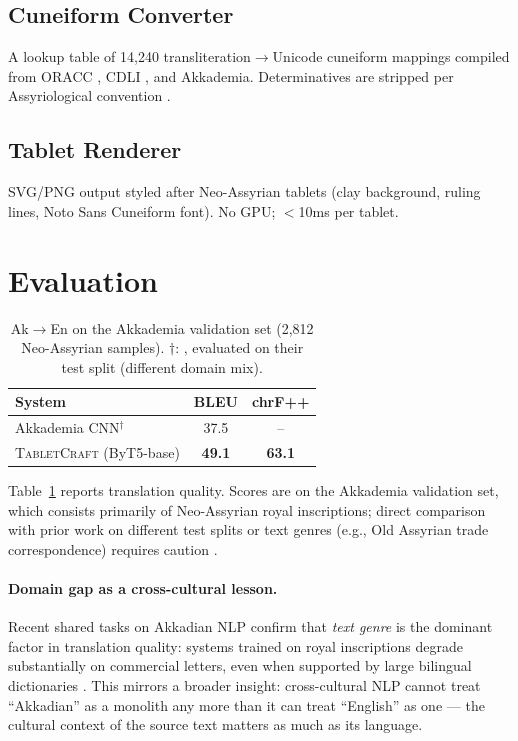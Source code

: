 \documentclass[11pt]{article}
\begin{document}
\subsection{Cuneiform Converter}

A lookup table of 14,240 transliteration$\rightarrow$Unicode cuneiform mappings compiled from ORACC \cite{oracc}, CDLI \cite{cdli}, and Akkademia.
Determinatives are stripped per Assyriological convention \cite{huehnergard2011grammar}.

\subsection{Tablet Renderer}

SVG/PNG output styled after Neo-Assyrian tablets (clay background, ruling lines, Noto Sans Cuneiform font). No GPU; $<$10ms per tablet.

\section{Evaluation}

\begin{table}[t]
\centering
\small
\begin{tabular}{lcc}
\toprule
\textbf{System} & \textbf{BLEU} & \textbf{chrF++} \\
\midrule
Akkademia CNN$^\dagger$ & 37.5 & -- \\
\textsc{TabletCraft} (ByT5-base) & \textbf{49.1} & \textbf{63.1} \\
\bottomrule
\end{tabular}
\caption{Ak$\rightarrow$En on the Akkademia validation set (2,812 Neo-Assyrian samples). $\dagger$: \citet{gutherz2023translating}, evaluated on their test split (different domain mix).}
\label{tab:results}
\end{table}

Table~\ref{tab:results} reports translation quality.
Scores are on the Akkademia validation set, which consists primarily of Neo-Assyrian royal inscriptions; direct comparison with prior work on different test splits or text genres (e.g., Old Assyrian trade correspondence) requires caution \cite{veenhof2008old}.

\paragraph{Domain gap as a cross-cultural lesson.}
Recent shared tasks on Akkadian NLP confirm that \textit{text genre} is the dominant factor in translation quality: systems trained on royal inscriptions degrade substantially on commercial letters, even when supported by large bilingual dictionaries \cite{gordin2025evacun}.
This mirrors a broader insight: cross-cultural NLP cannot treat ``Akkadian'' as a monolith any more than it can treat ``English'' as one --- the cultural context of the source text matters as much as its language.
\end{document}

